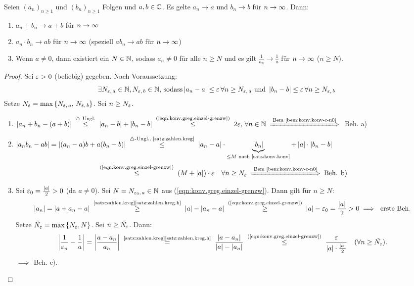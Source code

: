 \documentclass[12pt]{scrreprt}
\begin{document}
\begin{satz}
  \label{satz:konv.greg}
  Seien $(a_n)_{n\ge1}$ und $(b_n)_{n\ge1}$ Folgen und $a, b \in
  \mathbb{C}$. Es gelte $a_n \to a$ und $b_n \to b$ für $n\rightarrow\infty$. Dann:
  \begin{enumerate}
  \item $a_n+b_n \to a+b$ für $n\rightarrow\infty$ \label{satz:konv.greg.a}
  \item $a_n \cdot b_n \to ab$ für $n\rightarrow\infty$ (speziell $ab_n \to ab$ für
    $n\rightarrow\infty$)\label{satz:konv.greg.b}
  \item Wenn $a\ne0$, dann existiert ein $N\in\mathbb{N}$, sodass $a_n\ne0$
    für alle $n \ge N$ und es gilt $\displaystyle\frac{1}{a_n}\to\frac{1}{a}$ für
    $n\rightarrow\infty$ ($n\ge N$). \label{satz:konv.greg.c}
  \end{enumerate}
\end{satz}
\begin{proof}
  Sei $\varepsilon>0$ (beliebig) gegeben. Nach Voraussetzung:
  \begin{equation}\label{eqn:konv.greg.einzel-grenzw} \exists
    N_{\varepsilon,\,a}\in\mathbb{N}, N_{\varepsilon,\,b}\in\mathbb{N} \text{, sodass}
    \left\lvert a_n-a\right\lvert\le\varepsilon\,\forall n\ge N_{\varepsilon,\,a} \text{ und }
    \left\lvert b_n-b\right\lvert\le\varepsilon\,\forall n\ge N_{\varepsilon,\,b} \end{equation}
  Setze $N_\varepsilon = \max{\{N_{\varepsilon,\,a},\,N_{\varepsilon,\,b}\}}$. Sei $n\ge N_\varepsilon$.
  \begin{enumerate}
  \item $\abs{a_n+b_n-(a+b)} \nach{\le}{$\triangle$-Ungl.}
    \abs{a_n-b}+\abs{b_n-b}
    \nach{\le}{(\ref{eqn:konv.greg.einzel-grenzw})} 2\ep,\,\forall
    \nat{n} \folgtnach{Bem~\ref{bem:konv.konv-c-n0}}$ Beh. a)
  \item $\displaystyle\abs{a_nb_n-ab} = \abs{(a_n-a)b+a(b_n-b)}
      \nach{\le}{$\triangle$-Ungl., \ref{satz:zahlen.kreg}}
      \abs{a_n-a}\cdot\underbrace{\abs{b_n}}_{\le M \text{ nach
          \ref{satz:konv.konv}}}+\abs{a}\cdot\abs{b_n-b}$
      \[\nach{\le}{(\ref{eqn:konv.greg.einzel-grenzw})}
      (M+\abs{a})\cdot\ep\quad\forall n\ge N_\ep
      \folgtnach{Bem~\ref{bem:konv.konv-c-n0}} \text{Beh. b)}\]
  \item Sei $\varepsilon_0=\frac{\left\lvert a\right\lvert}{2}>0$ (da $a\ne0$). Sei
    $N=N_{\varepsilon_0,\,a}\in\mathbb{N}$ aus
    (\ref{eqn:konv.greg.einzel-grenzw}). Dann gilt für $n\ge N$:
    \[\abs{a_n}=\abs{a+a_n-a}
    \nach{\ge}{\ref{satz:zahlen.kreg}\ref{satz:zahlen.kreg.h}}
    \abs{a}-\abs{a_n-a}
    \nach{\ge}{(\ref{eqn:konv.greg.einzel-grenzw})} \abs{a}-\ep_0 =
    \frac{\abs{a}}{2} > 0 \folgt\ \text{erste Beh.}\]
    Setze $\tilde{N_\varepsilon} = \max{\{N_\varepsilon, N\}}$. Sei
    $n\ge\tilde{N_\varepsilon}$. Dann:
    \[\abs{\frac{1}{\ep_n}-\frac{1}{a}} = \abs{\frac{a-a_n}{a_n}}
    \nach{=}{\ref{satz:zahlen.kreg}\ref{satz:zahlen.kreg.h}}
    \frac{\abs{a-a_n}}{\abs{a}-\abs{a_n}}
    \nach{\le}{(\ref{eqn:konv.greg.einzel-grenzw})}
    \frac{\ep}{\abs{a}\cdot\frac{\abs{a}}{2}} \quad(\forall
    n\ge\tilde{N_\ep}).\]
    $\implies$ Beh. c).
  \end{enumerate}
\end{proof}
\end{document}
